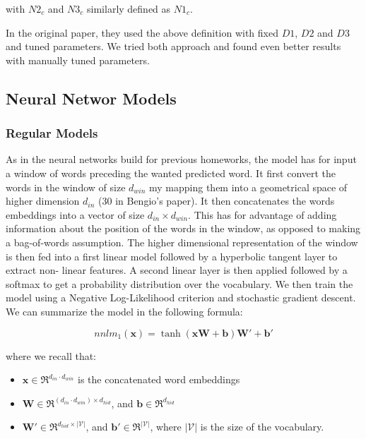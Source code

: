 \documentclass[11pt]{article}
\begin{document}
with $N2_c$ and $N3_c$ similarly defined as $N1_c$.



In the original paper, they used the above definition with fixed $D1$, $D2$ and $D3$ and tuned parameters. We tried both approach and found even better results with manually tuned parameters.

\subsection{Neural Networ Models}

\subsubsection{Regular Models}
As in the neural networks build for previous homeworks, the model has for input a window of words preceding the wanted predicted word. It first convert the words in the window of size $d_{win}$ my mapping them into a geometrical space of higher dimension $d_{in}$ (30 in Bengio's paper). It then concatenates the words embeddings into a vector of size $d_{in}\times d_{win}$. This has for advantage of adding information about the position of the words in the window, as opposed to making a bag-of-words assumption. The higher dimensional representation  of the window is then fed into a first linear model followed by a hyperbolic tangent layer to extract  non- linear features. A second linear layer is then applied followed by a softmax to get a probability distribution over the vocabulary. We then train the model using a Negative Log-Likelihood criterion and stochastic gradient descent.\\

\noindent We can summarize the model in the following formula:

$$ nnlm_1(\boldsymbol{x}) = \tanh(\boldsymbol{xW}+\boldsymbol{b})\boldsymbol{W'}+\boldsymbol{b'}$$

where we recall that:
\begin{itemize}
\item $\boldsymbol{x}\in \Re^{d_{in}\cdot d_{win}}$ is the concatenated word embeddings
\item $\boldsymbol{W}\in \Re^{(d_{in}\cdot d_{win})\times d_{hid}}$, and $\boldsymbol{b}\in \Re^{d_{hid}}$
\item $\boldsymbol{W'}\in \Re^{d_{hid}\times |\mathcal{V}|}$, and $\boldsymbol{b'}\in \Re^{|\mathcal{V}|}$, where $|\mathcal{V}|$ is the size of the vocabulary.
\end{itemize}
\end{document}
